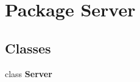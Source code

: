 \section{Package Server}
\label{namespace_server}
\subsection*{Classes}
\begin{DoxyCompactItemize}
\item 
class {\bf Server}
\end{DoxyCompactItemize}
